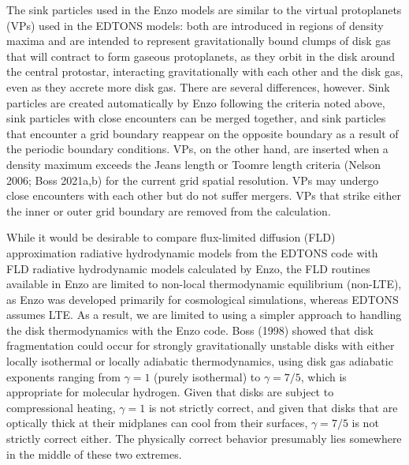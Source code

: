 \documentclass[12pt,preprint]{aastex}
\begin{document}
 The sink particles used in the Enzo models are similar to the virtual protoplanets (VPs) 
used in the EDTONS models: both are introduced in regions of density maxima and are intended to represent
gravitationally bound clumps of disk gas that will contract to form gaseous protoplanets, as they orbit in the
disk around the central protostar, interacting gravitationally with each other and the disk gas, even as they accrete 
more disk gas. There are several differences, however. Sink particles are created automatically by Enzo following
the criteria noted above, sink particles with close encounters can be merged together, and sink particles that encounter a 
grid boundary reappear on the opposite boundary as a result of the periodic boundary conditions. VPs, on the other 
hand, are inserted when a density maximum exceeds the Jeans length or Toomre length criteria 
(Nelson 2006; Boss 2021a,b) for the current grid spatial resolution. VPs may undergo close encounters with
each other but do not suffer mergers. VPs that strike either the inner or outer grid boundary are removed from
the calculation.

 While it would be desirable to compare flux-limited diffusion (FLD) approximation radiative 
hydrodynamic models from the EDTONS code with FLD radiative hydrodynamic models calculated by 
Enzo, the FLD routines available in Enzo are limited to non-local thermodynamic equilibrium (non-LTE), 
as Enzo was developed primarily for cosmological simulations, whereas EDTONS assumes LTE. As a 
result, we are limited to using a simpler approach to handling the disk thermodynamics with the Enzo code.
Boss (1998) showed that disk fragmentation could occur for strongly gravitationally unstable
disks with either locally isothermal or locally adiabatic thermodynamics, using disk gas adiabatic 
exponents ranging from $\gamma = 1$ (purely isothermal) to $\gamma = 7/5$, which is appropriate 
for molecular hydrogen. Given that disks are subject to compressional heating,  $\gamma = 1$ is
not strictly correct, and given that disks that are optically thick at their midplanes can cool from their 
surfaces,  $\gamma = 7/5$ is not strictly correct either. The physically correct behavior presumably
lies somewhere in the middle of these two extremes. 
\end{document}
